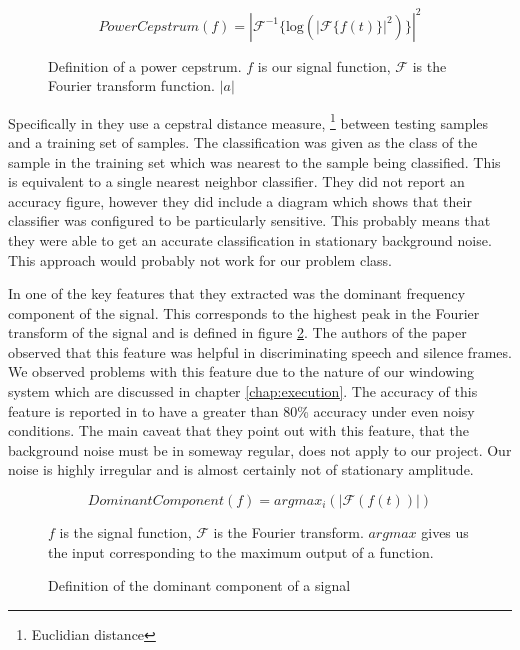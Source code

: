 \documentclass[ %
                    author={Sam Phippen},
                supervisor={Dr. Rafal Bogacz},
                     title={Real time voice activity detectors in noisy personal computing environments},
                  subtitle={},
                    degree={MEng},
                      year={2012} ]{thesis}
\begin{document}
\begin{figure}
    $$PowerCepstrum(f)=|\mathcal{F}^{-1}\{\mbox{log}(|\mathcal{F}\{ f(t) \}|^2)\}|^2$$
    \caption{Definition of a power cepstrum. $f$ is our
    signal function, $\mathcal{F}$ is the Fourier transform function. $|a|$}
    \label{eqn:power-cepstrum}

\end{figure}

Specifically in \cite{haigh} they use a cepstral distance measure,
\footnote{Euclidian distance} between testing samples and a training set of
samples. The classification was given as the class of the sample in the
training set which was nearest to the sample being classified. This is
equivalent to a single nearest neighbor classifier. They did not report an
accuracy figure, however they did include a diagram which shows that their
classifier was configured to be particularly sensitive. This probably means
that they were able to get an accurate classification in stationary background
noise. This approach would probably not work for our problem class.

In \cite{moattar} one of the key features that they extracted was the dominant
frequency component of the signal. This corresponds to the highest peak in the
Fourier transform of the signal and is defined in figure \ref{eqn:dom-freq}.
The authors of the paper observed that this feature was helpful in
discriminating speech and silence frames. We observed problems with this
feature due to the nature of our windowing system which are discussed in
chapter \ref{chap:execution}. The accuracy of this feature is reported in
\cite{moattar} to have a greater than 80\% accuracy under even noisy
conditions. The main caveat that they point out with this feature, that the
background noise must be in someway regular, does not apply to our project. Our
noise is highly irregular and is almost certainly not of stationary amplitude.

\begin{figure}
    $$DominantComponent(f) = argmax_i(|\mathcal{F}(f(t))|)$$

    $f$ is the signal
    function, $\mathcal{F}$ is the Fourier transform. $argmax$ gives us the
    input corresponding to the maximum output of a function.
    \caption{Definition of the dominant component of a signal}
    \label{eqn:dom-freq}
\end{figure}
\end{document}
